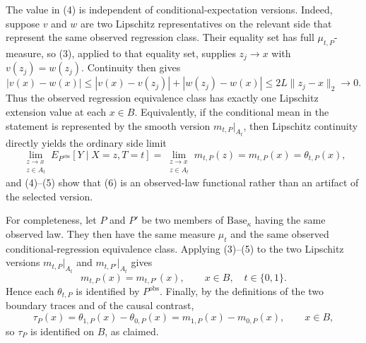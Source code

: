 The value in (4) is independent of conditional-expectation versions.  Indeed, suppose \(v\) and \(w\) are two Lipschitz representatives on the relevant side that represent the same observed regression class.  Their equality set has full \(\mu_{t,P}\)-measure, so (3), applied to that equality set, supplies \(z_j\to x\) with \(v(z_j)=w(z_j)\).  Continuity then gives
\[
 |v(x)-w(x)|
 \le |v(x)-v(z_j)|+|w(z_j)-w(x)|
 \le 2L\lVert z_j-x\rVert_2\longrightarrow0.
\tag{5}
\]
Thus the observed regression equivalence class has exactly one Lipschitz extension value at each \(x\in B\).  Equivalently, if the conditional mean in the statement is represented by the smooth version \(m_{t,P}|_{A_t}\), then Lipschitz continuity directly yields the ordinary side limit
\[
 \lim_{\substack{z\to x\\ z\in A_t}}
 E_{P^{\mathrm{obs}}}[Y\mid X=z,T=t]
 =\lim_{\substack{z\to x\\ z\in A_t}}m_{t,P}(z)
 =m_{t,P}(x)=\theta_{t,P}(x),
\tag{6}
\]
and (4)--(5) show that (6) is an observed-law functional rather than an artifact of the selected version.

For completeness, let \(P\) and \(P'\) be two members of \(\mathrm{Base}_\kappa\) having the same observed law.  They then have the same measure \(\mu_t\) and the same observed conditional-regression equivalence class.  Applying (3)--(5) to the two Lipschitz versions \(m_{t,P}|_{A_t}\) and \(m_{t,P'}|_{A_t}\) gives
\[
 m_{t,P}(x)=m_{t,P'}(x),\qquad x\in B,\quad t\in\{0,1\}.
\tag{7}
\]
Hence each \(\theta_{t,P}\) is identified by \(P^{\mathrm{obs}}\).  Finally, by the definitions of the two boundary traces and of the causal contrast,
\[
 \tau_P(x)=\theta_{1,P}(x)-\theta_{0,P}(x)
 =m_{1,P}(x)-m_{0,P}(x),\qquad x\in B,
\]
so \(\tau_P\) is identified on \(B\), as claimed.
